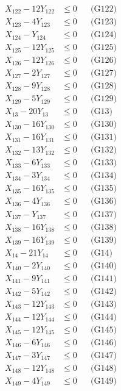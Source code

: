 \documentclass[a4paper,10pt]{article}
\begin{document}
{\begin{align}
X_{122} - 12Y_{122} &\leq 0 && \text{(G122)} \\
X_{123} - 4Y_{123} &\leq 0 && \text{(G123)} \\
X_{124} - Y_{124} &\leq 0 && \text{(G124)} \\
X_{125} - 12Y_{125} &\leq 0 && \text{(G125)} \\
X_{126} - 12Y_{126} &\leq 0 && \text{(G126)} \\
X_{127} - 2Y_{127} &\leq 0 && \text{(G127)} \\
X_{128} - 9Y_{128} &\leq 0 && \text{(G128)} \\
X_{129} - 5Y_{129} &\leq 0 && \text{(G129)} \\
X_{13} - 20Y_{13} &\leq 0 && \text{(G13)} \\
X_{130} - 16Y_{130} &\leq 0 && \text{(G130)} \\
X_{131} - 16Y_{131} &\leq 0 && \text{(G131)} \\
X_{132} - 13Y_{132} &\leq 0 && \text{(G132)} \\
X_{133} - 6Y_{133} &\leq 0 && \text{(G133)} \\
\allowbreak
X_{134} - 3Y_{134} &\leq 0 && \text{(G134)} \\
X_{135} - 16Y_{135} &\leq 0 && \text{(G135)} \\
X_{136} - 4Y_{136} &\leq 0 && \text{(G136)} \\
X_{137} - Y_{137} &\leq 0 && \text{(G137)} \\
X_{138} - 16Y_{138} &\leq 0 && \text{(G138)} \\
X_{139} - 16Y_{139} &\leq 0 && \text{(G139)} \\
X_{14} - 21Y_{14} &\leq 0 && \text{(G14)} \\
X_{140} - 2Y_{140} &\leq 0 && \text{(G140)} \\
X_{141} - 9Y_{141} &\leq 0 && \text{(G141)} \\
X_{142} - 5Y_{142} &\leq 0 && \text{(G142)} \\
X_{143} - 12Y_{143} &\leq 0 && \text{(G143)} \\
X_{144} - 12Y_{144} &\leq 0 && \text{(G144)} \\
X_{145} - 12Y_{145} &\leq 0 && \text{(G145)} \\
X_{146} - 6Y_{146} &\leq 0 && \text{(G146)} \\
X_{147} - 3Y_{147} &\leq 0 && \text{(G147)} \\
X_{148} - 12Y_{148} &\leq 0 && \text{(G148)} \\
X_{149} - 4Y_{149} &\leq 0 && \text{(G149)} \\

\end{align}}
\end{document}
